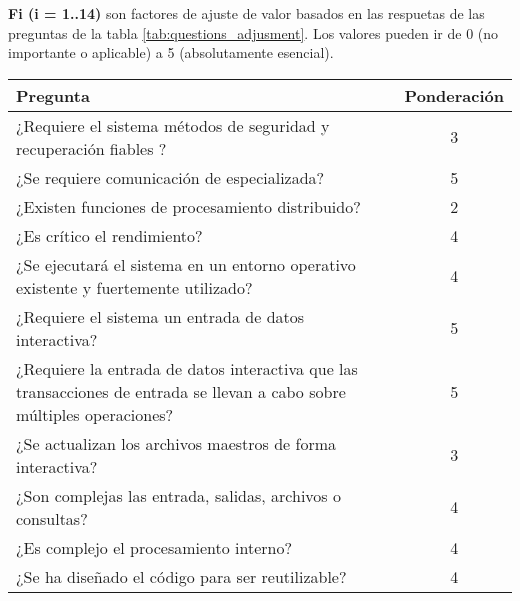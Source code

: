 	\textbf{Fi (i = 1..14)} son factores de ajuste de valor basados en las respuetas de las preguntas de la tabla \ref{tab:questions_adjusment}. Los valores pueden ir de 0 (no importante o aplicable) a 5 (absolutamente esencial).

	\begin{table}
		\begin{tabular}{|p{9cm}|c|}
		\hline
		Pregunta                                                                                                                 & Ponderación \\ \hline
		¿Requiere el sistema métodos de seguridad y recuperación fiables ?                                                       & 3           \\ \hline
		¿Se requiere comunicación de especializada?                                                                              & 5           \\ \hline
		¿Existen funciones de procesamiento distribuido?                                                                         & 2           \\ \hline
		¿Es crítico el rendimiento?                                                                                              & 4           \\ \hline
		¿Se ejecutará el sistema en un entorno operativo existente y fuertemente utilizado?                                      & 4           \\ \hline
		¿Requiere el sistema un entrada de datos interactiva?                                                                    & 5           \\ \hline
		¿Requiere la entrada de datos interactiva que las transacciones de entrada se llevan a cabo sobre múltiples operaciones? & 5           \\ \hline
		¿Se actualizan los archivos maestros de forma interactiva?                                                               & 3           \\ \hline
		¿Son complejas las entrada, salidas, archivos o consultas?                                                               & 4           \\ \hline
		¿Es complejo el procesamiento interno?                                                                                   & 4           \\ \hline
		¿Se ha diseñado el código para ser reutilizable?                                                                         & 4           \\ \hline

\end{tabular}
\end{table}
